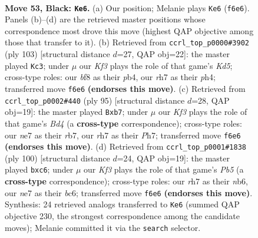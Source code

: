 \documentclass[11pt]{article}
\begin{document}
\clearpage

\begin{figure}[p]\centering
\begin{subfigure}{0.46\textwidth}\centering
\resizebox{\linewidth}{!}{%
\newchessgame
\chessboard[
  setfen={5B2/p3N2R/P4k2/1P3pb1/3K4/8/8/8 b - - 13 53},
  showmover=false,
  pgfstyle=straightmove, color=movearrow, markmove={f6-e6}
]}
\caption{}
\end{subfigure}\hfill
\begin{subfigure}{0.46\textwidth}\centering
\resizebox{\linewidth}{!}{%
\newchessgame
\chessboard[
  setfen={8/7p/8/1pN5/1Pbk3P/P4K2/8/8 b - - 1 52},
  showmover=false,
  pgfstyle=straightmove, color=movearrow, markmove={d4-c3}
]}
\caption{}
\end{subfigure}
\\[4pt]
\begin{subfigure}{0.46\textwidth}\centering
\resizebox{\linewidth}{!}{%
\newchessgame
\chessboard[
  setfen={6k1/1R4pp/5p2/3b4/3N4/4K1P1/7P/8 b - - 0 48},
  showmover=false,
  pgfstyle=straightmove, color=movearrow, markmove={d5-b7}
]}
\caption{}
\end{subfigure}\hfill
\begin{subfigure}{0.46\textwidth}\centering
\resizebox{\linewidth}{!}{%
\newchessgame
\chessboard[
  setfen={8/p7/1nb2k2/1P6/3K3p/3B4/7P/8 w - - 0 51},
  showmover=false,
  pgfstyle=straightmove, color=movearrow, markmove={b5-c6}
]}
\caption{}
\end{subfigure}
\caption{\textbf{Move 53, Black: \texttt{Ke6}.} (a) Our position; Melanie plays \texttt{Ke6} (\texttt{f6e6}). Panels (b)--(d) are the retrieved master positions whose correspondence most drove this move (highest QAP objective among those that transfer to it). (b) Retrieved from \texttt{ccrl\_top\_p0000\#3902} (ply 103) [structural distance $d$=27, QAP obj=22]: the master played \texttt{Kc3}; under $\mu$ our \emph{Kf3} plays the role of that game's \emph{Kd5}; cross-type roles: our \emph{b}f8 as their \emph{p}b4, our \emph{r}h7 as their \emph{p}h4; transferred move \texttt{f6e6} \textbf{(endorses this move)}. (c) Retrieved from \texttt{ccrl\_top\_p0002\#440} (ply 95) [structural distance $d$=28, QAP obj=19]: the master played \texttt{Bxb7}; under $\mu$ our \emph{Kf3} plays the role of that game's \emph{Bd4} (a \textbf{cross-type} correspondence); cross-type roles: our \emph{n}e7 as their \emph{r}b7, our \emph{r}h7 as their \emph{P}h7; transferred move \texttt{f6e6} \textbf{(endorses this move)}. (d) Retrieved from \texttt{ccrl\_top\_p0001\#1838} (ply 100) [structural distance $d$=24, QAP obj=19]: the master played \texttt{bxc6}; under $\mu$ our \emph{Kf3} plays the role of that game's \emph{Pb5} (a \textbf{cross-type} correspondence); cross-type roles: our \emph{r}h7 as their \emph{n}b6, our \emph{n}e7 as their \emph{b}c6; transferred move \texttt{f6e6} \textbf{(endorses this move)}. Synthesis: 24 retrieved analogs transferred to \texttt{Ke6} (summed QAP objective 230, the strongest correspondence among the candidate moves); Melanie committed it via the \texttt{search} selector.}
\label{fig:thought-m105}
\end{figure}
\end{document}
